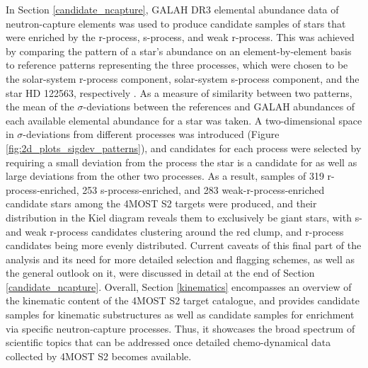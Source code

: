 \documentclass[a4paper,11pt]{article}
\begin{document}
In Section \ref{candidate_ncapture}, GALAH DR3 elemental abundance data of neutron-capture elements was used to produce candidate samples of stars that were enriched by the r-process, s-process, and weak r-process. This was achieved by comparing the pattern of a star's abundance on an element-by-element basis to reference patterns representing the three processes, which were chosen to be the solar-system r-process component, solar-system s-process component, and the star HD 122563, respectively \citep{prantzos20,honda06}. As a measure of similarity between two patterns, the mean of the $\sigma$-deviations between the references and GALAH abundances of each available elemental abundance for a star was taken. A two-dimensional space in $\sigma$-deviations from different processes was introduced (Figure \ref{fig:2d_plots_sigdev_patterns}), and candidates for each process were selected by requiring a small deviation from the process the star is a candidate for as well as large deviations from the other two processes. As a result, samples of 319 r-process-enriched, 253 s-process-enriched, and 283 weak-r-process-enriched candidate stars among the 4MOST S2 targets were produced, and their distribution in the Kiel diagram reveals them to exclusively be giant stars, with s- and weak r-process candidates clustering around the red clump, and r-process candidates being more evenly distributed. Current caveats of this final part of the analysis and its need for more detailed selection and flagging schemes, as well as the general outlook on it, were discussed in detail at the end of Section \ref{candidate_ncapture}. Overall, Section \ref{kinematics} encompasses an overview of the kinematic content of the 4MOST S2 target catalogue, and provides candidate samples for kinematic substructures as well as candidate samples for enrichment via specific neutron-capture processes. Thus, it showcases the broad spectrum of scientific topics that can be addressed once detailed chemo-dynamical data collected by 4MOST S2 becomes available.
%
%
%
%
%
\clearpage
\end{document}
